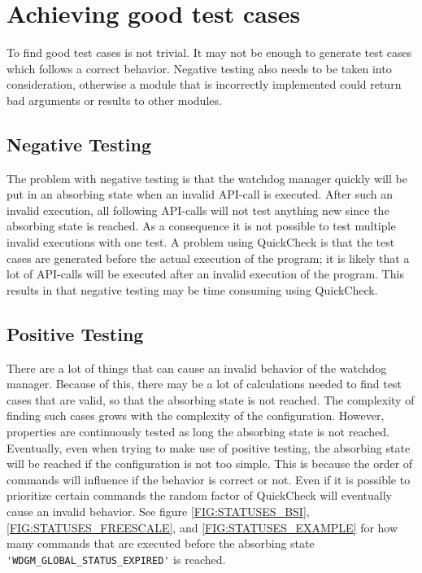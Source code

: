 
\section{Achieving good test cases}
To find good test cases is not trivial. It may not be enough to
generate test cases which follows a correct behavior. Negative testing
also needs to be taken into consideration, otherwise a module that is
incorrectly implemented could return bad arguments or results to other
modules.

\subsection{Negative Testing}
The problem with negative testing is that the watchdog manager quickly
will be put in an absorbing state when an invalid API-call is
executed. After such an invalid execution, all following API-calls
will not test anything new since the absorbing state is reached. As a
consequence it is not possible to test multiple invalid executions
with one test. A problem using QuickCheck is that the test cases are
generated before the actual execution of the program; it is likely
that a lot of API-calls will be executed after an invalid execution of
the program. This results in that negative testing may be time
consuming using QuickCheck.

\subsection{Positive Testing}
There are a lot of things that can cause an invalid behavior of the
watchdog manager. Because of this, there may be a lot of calculations
needed to find test cases that are valid, so that the absorbing state
is not reached. The complexity of finding such cases grows with the
complexity of the configuration. However, properties are continuously
tested as long the absorbing state is not reached. Eventually, even
when trying to make use of positive testing, the absorbing state will
be reached if the configuration is not too simple. This is because the
order of commands will influence if the behavior is correct or
not. Even if it is possible to prioritize certain commands the random
factor of QuickCheck will eventually cause an invalid behavior. See
figure \ref{FIG:STATUSES_BSI}, \ref{FIG:STATUSES_FREESCALE}, and
\ref{FIG:STATUSES_EXAMPLE} for how many commands that are executed
before the absorbing state \lstinline!'WDGM_GLOBAL_STATUS_EXPIRED'! is
reached.

